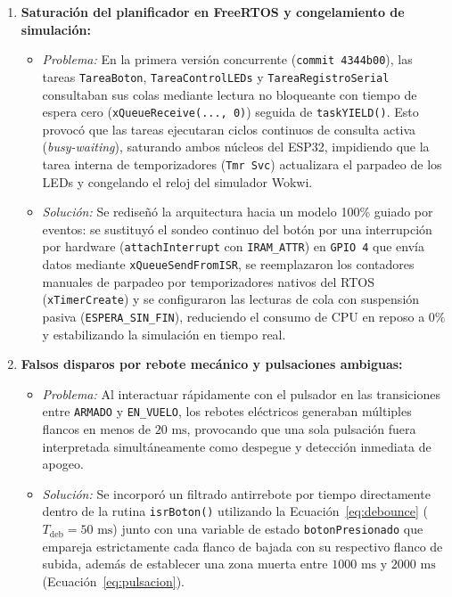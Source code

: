 \documentclass[10pt, letterpaper]{article}
\begin{document}
\begin{enumerate}\setlength{\itemsep}{2pt}\setlength{\parskip}{1pt}
    \item \textbf{Saturación del planificador en FreeRTOS y congelamiento de simulación:}
    \begin{itemize}\setlength{\itemsep}{1pt}
        \item \textit{Problema:} En la primera versión concurrente (\texttt{commit 4344b00}), las tareas \texttt{TareaBoton}, \texttt{TareaControlLEDs} y \texttt{TareaRegistroSerial} consultaban sus colas mediante lectura no bloqueante con tiempo de espera cero (\texttt{xQueueReceive(..., 0)}) seguida de \texttt{taskYIELD()}. Esto provocó que las tareas ejecutaran ciclos continuos de consulta activa (\textit{busy-waiting}), saturando ambos núcleos del ESP32, impidiendo que la tarea interna de temporizadores (\texttt{Tmr Svc}) actualizara el parpadeo de los LEDs y congelando el reloj del simulador Wokwi.
        \item \textit{Solución:} Se rediseñó la arquitectura hacia un modelo 100\% guiado por eventos: se sustituyó el sondeo continuo del botón por una interrupción por hardware (\texttt{attachInterrupt} con \texttt{IRAM\_ATTR}) en \texttt{GPIO 4} que envía datos mediante \texttt{xQueueSendFromISR}, se reemplazaron los contadores manuales de parpadeo por temporizadores nativos del RTOS (\texttt{xTimerCreate}) y se configuraron las lecturas de cola con suspensión pasiva (\texttt{ESPERA\_SIN\_FIN}), reduciendo el consumo de CPU en reposo a $0\%$ y estabilizando la simulación en tiempo real.
    \end{itemize}

    \item \textbf{Falsos disparos por rebote mecánico y pulsaciones ambiguas:}
    \begin{itemize}\setlength{\itemsep}{1pt}
        \item \textit{Problema:} Al interactuar rápidamente con el pulsador en las transiciones entre \texttt{ARMADO} y \texttt{EN\_VUELO}, los rebotes eléctricos generaban múltiples flancos en menos de $20\text{ ms}$, provocando que una sola pulsación fuera interpretada simultáneamente como despegue y detección inmediata de apogeo.
        \item \textit{Solución:} Se incorporó un filtrado antirrebote por tiempo directamente dentro de la rutina \texttt{isrBoton()} utilizando la Ecuación~\eqref{eq:debounce} ($T_{\text{deb}} = 50\text{ ms}$) junto con una variable de estado \texttt{botonPresionado} que empareja estrictamente cada flanco de bajada con su respectivo flanco de subida, además de establecer una zona muerta entre $1000\text{ ms}$ y $2000\text{ ms}$ (Ecuación~\eqref{eq:pulsacion}).
    \end{itemize}


\end{enumerate}
\end{document}
